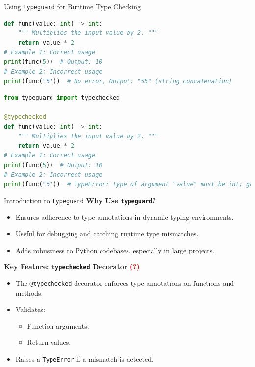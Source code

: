 \documentclass[10pt]{beamer}
\let\olditem\item
\renewcommand\item{\olditem\justifying}
\newcommand{\mypause}{\pause}
\begin{document}
	
	
	\begin{frame}[fragile]{Using \texttt{typeguard} for Runtime Type Checking}
		\begin{lstlisting}[language=Python, caption=Without \texttt{typechecked}]
def func(value: int) -> int:
	""" Multiplies the input value by 2. """
	return value * 2
# Example 1: Correct usage
print(func(5))  # Output: 10
# Example 2: Incorrect usage
print(func("5"))  # No error, Output: "55" (string concatenation)
		\end{lstlisting}
		
		\begin{lstlisting}[language=Python, caption=With \texttt{typechecked}]
from typeguard import typechecked

@typechecked
def func(value: int) -> int:
	""" Multiplies the input value by 2. """
	return value * 2
# Example 1: Correct usage
print(func(5))  # Output: 10
# Example 2: Incorrect usage
print(func("5"))  # TypeError: type of argument "value" must be int; got str instead
		\end{lstlisting}
	\end{frame}
	
	
	\begin{frame}{Introduction to \texttt{typeguard}}
		\textbf{Why Use \texttt{typeguard}\supercite{typeguardUserGuide}?}
		\begin{itemize}
			\item Ensures adherence to type annotations in dynamic typing environments.
			\item Useful for debugging and catching runtime type mismatches.
			\item Adds robustness to Python codebases, especially in large projects.
		\end{itemize}
		\mypause
		\textbf{Key Feature: \texttt{typechecked} Decorator \textcolor{red}{(?)}}
		\begin{itemize}
			\item The \texttt{@typechecked} decorator enforces type annotations on functions and methods.
			\item Validates:
			\begin{itemize}
				\item Function arguments.
				\item Return values.
			\end{itemize}
			\item Raises a \texttt{TypeError} if a mismatch is detected.
		\end{itemize}
	\end{frame}
	
\end{document}
